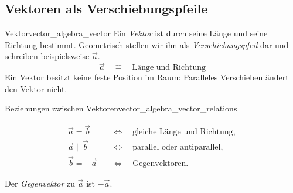 \subsection{Vektoren als Verschiebungspfeile}
\label{subsec:vector_algebra_vectors_as_displacements}

\begin{DefinitionBox}{Vektor}{vector_algebra_vector}
  Ein \emph{Vektor}  ist durch seine Länge und seine
  Richtung bestimmt. Geometrisch stellen wir ihn als
  \emph{Verschiebungspfeil}  dar und schreiben
  beispielsweise $\vec a$.
  \[
    \vec a
    \quad\widehat{=}\quad
    \text{Länge und Richtung}
  \]
  Ein Vektor besitzt keine feste Position im Raum: Paralleles Verschieben
  ändert den Vektor nicht.
\end{DefinitionBox}

\begin{center}
\end{center}

\begin{KeyPointBox}{Beziehungen zwischen Vektoren}{vector_algebra_vector_relations}
  \noindent
  \begin{minipage}[c]{0.50\linewidth}
    \begin{align*}
      \vec a=\vec b
      &\quad\Longleftrightarrow\quad
      \text{gleiche Länge und Richtung},\\[0.6em]
      \vec a\parallel\vec b
      &\quad\Longleftrightarrow\quad
      \text{parallel oder antiparallel},\\[0.6em]
      \vec b=-\vec a
      &\quad\Longleftrightarrow\quad
      \text{Gegenvektoren}.
    \end{align*}
  \end{minipage}\hfill
  \begin{minipage}[c]{0.46\linewidth}
    \centering
  \end{minipage}
\end{KeyPointBox}

Der \emph{Gegenvektor}  zu $\vec a$ ist $-\vec a$.
